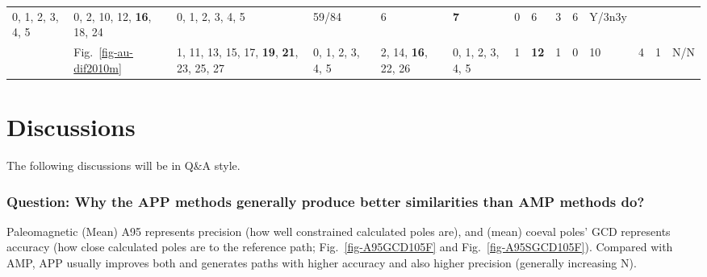 \begin{table*}
{\begin{tabular}{l|l|l|l|l|l|l|l|l|l|l|l|l|l}
  \multirow{2}{*}{\parbox{1cm}{0, 1, 2, 3, 4, 5}} &
  \multirow{2}{*}{\parbox{2.4cm}{0, 2, 10, 12, \textbf{16}, 18, 24}} &
  \multirow{2}{*}{\parbox{1cm}{0, 1, 2, 3, 4, 5}} & 59/84 & 6 & \textbf{7} & 0
  & 6 & 3 & 6 & Y/3n3y \\ \\ \cline{2-14}
& Fig.~\ref{fig-au-dif2010m} & \multirow{2}{*}{\parbox{2cm}{1, 11, 13, 15, 17,
  \textbf{19}, \textbf{21}, 23, 25, 27}} & \multirow{2}{*}{\parbox{1cm}{0, 1, 2, 3, 4, 5}} &
  \multirow{2}{*}{\parbox{2cm}{2, 14, \textbf{16}, 22, 26}} &
  \multirow{2}{*}{\parbox{1cm}{0, 1, 2, 3, 4, 5}} & 1 & \textbf{12} & 1 & 0 &
  10 & 4 & 1 & N/N
\end{tabular}%
}
\end{table*}

\section{Discussions}

The following discussions will be in Q\&A style.

\subsubsection{Question: Why the APP methods generally produce better
similarities than AMP methods do?}

Paleomagnetic (Mean) A95 represents precision (how well constrained calculated
poles are), and (mean) coeval poles' GCD represents accuracy (how close
calculated poles are to the reference path; Fig.~\ref{fig-A95GCD105F} and
Fig.~\ref{fig-A95SGCD105F}). Compared with AMP, APP usually improves both and
generates paths with higher accuracy and also higher precision (generally
increasing N).

